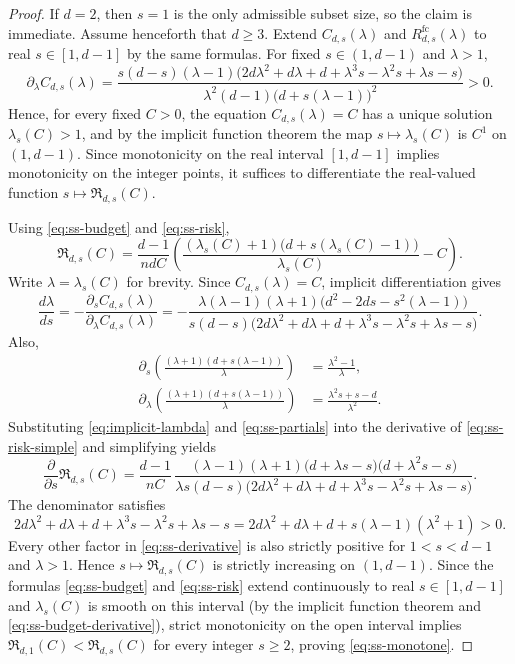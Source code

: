 \documentclass[11pt]{amsart}
\numberwithin{equation}{section}
\theoremstyle{definition}
\begin{document}
\begin{proof}
If \(d=2\), then \(s=1\) is the only admissible subset size, so the claim is immediate.
Assume henceforth that \(d\ge 3\).
Extend \(C_{d,s}(\lambda)\) and \(R^{\mathrm{fc}}_{d,s}(\lambda)\) to real \(s\in[1,d-1]\) by the same formulas.
For fixed \(s\in(1,d-1)\) and \(\lambda>1\),
\[
\partial_\lambda C_{d,s}(\lambda)
=
\frac{s(d-s)(\lambda-1)\bigl(2d\lambda^2+d\lambda+d+\lambda^3 s-\lambda^2 s+\lambda s-s\bigr)}
{\lambda^2(d-1)\bigl(d+s(\lambda-1)\bigr)^2}
>0. \tag{12.10}\label{eq:ss-budget-derivative}
\]
Hence, for every fixed \(C>0\), the equation \(C_{d,s}(\lambda)=C\) has a unique solution
\(\lambda_s(C)>1\), and by the implicit function theorem the map
\(s\mapsto \lambda_s(C)\) is \(C^1\) on \((1,d-1)\).
Since monotonicity on the real interval \([1,d-1]\) implies monotonicity on the integer points,
it suffices to differentiate the real-valued function \(s\mapsto \mathfrak R_{d,s}(C)\).

Using \eqref{eq:ss-budget} and \eqref{eq:ss-risk},
\[
\mathfrak R_{d,s}(C)
=
\frac{d-1}{ndC}
\left(
\frac{(\lambda_s(C)+1)\bigl(d+s(\lambda_s(C)-1)\bigr)}{\lambda_s(C)}-C
\right). \tag{12.11}\label{eq:ss-risk-simple}
\]
Write \(\lambda=\lambda_s(C)\) for brevity.
Since \(C_{d,s}(\lambda)=C\), implicit differentiation gives
\[
\frac{d\lambda}{ds}
=
-\frac{\partial_s C_{d,s}(\lambda)}{\partial_\lambda C_{d,s}(\lambda)}
=
-\frac{\lambda(\lambda-1)(\lambda+1)\bigl(d^2-2ds-s^2(\lambda-1)\bigr)}
{s(d-s)\bigl(2d\lambda^2+d\lambda+d+\lambda^3 s-\lambda^2 s+\lambda s-s\bigr)}. \tag{12.12}\label{eq:implicit-lambda}
\]
Also,
\[
\begin{aligned}
\partial_s\!\left(
\frac{(\lambda+1)(d+s(\lambda-1))}{\lambda}
\right)
&=
\frac{\lambda^2-1}{\lambda},\\
\partial_\lambda\!\left(
\frac{(\lambda+1)(d+s(\lambda-1))}{\lambda}
\right)
&=
\frac{\lambda^2 s+s-d}{\lambda^2}.
\end{aligned} \tag{12.13}\label{eq:ss-partials}
\]
Substituting \eqref{eq:implicit-lambda} and \eqref{eq:ss-partials} into the derivative of
\eqref{eq:ss-risk-simple} and simplifying yields
\[
\frac{\partial}{\partial s}\mathfrak R_{d,s}(C)
=
\frac{d-1}{nC}\,
\frac{
(\lambda-1)(\lambda+1)\bigl(d+\lambda s-s\bigr)\bigl(d+\lambda^2 s-s\bigr)
}{
\lambda s(d-s)\bigl(2d\lambda^2+d\lambda+d+\lambda^3 s-\lambda^2 s+\lambda s-s\bigr)
}. \tag{12.14}\label{eq:ss-derivative}
\]
The denominator satisfies
\[
2d\lambda^2+d\lambda+d+\lambda^3 s-\lambda^2 s+\lambda s-s
=
2d\lambda^2+d\lambda+d+s(\lambda-1)(\lambda^2+1)>0. \tag{12.15}\label{eq:ss-den-positive}
\]
Every other factor in \eqref{eq:ss-derivative} is also strictly positive for
\(1<s<d-1\) and \(\lambda>1\).
Hence \(s\mapsto \mathfrak R_{d,s}(C)\) is strictly increasing on \((1,d-1)\).
Since the formulas \eqref{eq:ss-budget} and \eqref{eq:ss-risk} extend continuously to real \(s\in[1,d-1]\)
and \(\lambda_s(C)\) is smooth on this interval (by the implicit function theorem and
\eqref{eq:ss-budget-derivative}), strict monotonicity on the open interval implies
\(\mathfrak R_{d,1}(C)<\mathfrak R_{d,s}(C)\) for every integer \(s\ge 2\),
proving \eqref{eq:ss-monotone}.
\end{proof}
\end{document}
